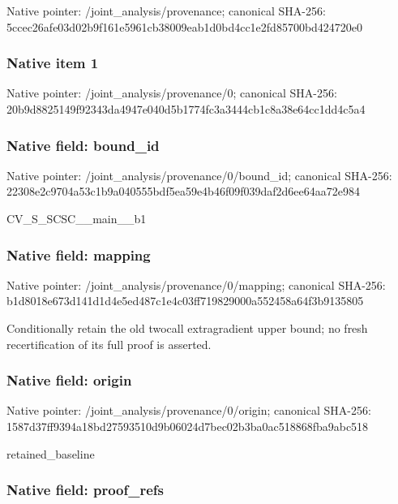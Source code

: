 \documentclass[10pt,a4paper]{article}
\begin{document}
Native pointer: /joint\_analysis/provenance; canonical SHA-256: 5ccec26afe03d02b9f161e59\allowbreak{}61cb38009eab1d0bd4cc1e2f\allowbreak{}d85700bd424720e0



\subsubsection{Native item 1}


Native pointer: /joint\_analysis/provenance/0; canonical SHA-256: 20b9d8825149f92343da4947\allowbreak{}e040d5b1774fc3a3444cb1c8\allowbreak{}a38e64cc1dd4c5a4



\subsubsection{Native field: bound\_id}


Native pointer: /joint\_analysis/provenance/0/bound\_id; canonical SHA-256: 22308e2c9704a53c1b9a0405\allowbreak{}55bdf5ea59e4b46f09f039da\allowbreak{}f2d6ee64aa72e984


CV\_S\_SCSC\_\_main\_\_b1


\subsubsection{Native field: mapping}


Native pointer: /joint\_analysis/provenance/0/mapping; canonical SHA-256: b1d8018e673d141d1d4e5ed4\allowbreak{}87c1e4c03ff719829000a552\allowbreak{}458a64f3b9135805


Conditionally retain the old twocall extragradient upper bound; no fresh recertification of its full proof is asserted.


\subsubsection{Native field: origin}


Native pointer: /joint\_analysis/provenance/0/origin; canonical SHA-256: 1587d37ff9394a18bd275935\allowbreak{}10d9b06024d7bec02b3ba0ac\allowbreak{}518868fba9abc518


retained\_baseline


\subsubsection{Native field: proof\_refs}
\end{document}

